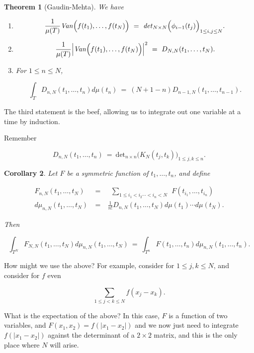 \documentclass[12pt,letterpaper]{report}
\newcommand\be{\begin{equation}}
\newcommand\ee{\end{equation}}
\newcommand\bea{\begin{eqnarray}}
\newcommand\eea{\end{eqnarray}}
\newcommand\ben{\begin{enumerate}}
\newcommand\een{\end{enumerate}}
\newtheorem{thm}{Theorem}[section]
\newtheorem{cor}[thm]{Corollary}
\begin{document}
\begin{thm}[Gaudin-Mehta] We have

\ben

\item

\be \frac{1}{\mu(T)}
\text{\emph{Van}}\Big(f(t_1),\dots,f(t_N)\Big) \ = \
\text{\emph{det}}_{N \times N} \Big( \phi_{i-1}(t_j) \Big)_{1 \le
i,j \le N}. \ee


\item

\be \frac{1}{\mu(T)}
\Big|\text{\emph{Van}}\Big(f(t_1),\dots,f(t_N)\Big)\Big|^2 \ = \
D_{N,N}(t_1,\dots,t_N). \ee


\item For $1 \le n \le N$,

\be \int_T D_{n,N}(t_1,\dots,t_n)d\mu(t_n) \ = \
(N+1-n)D_{n-1,N}(t_1,\dots,t_{n-1}). \ee


\een

\end{thm}

The third statement is the beef, allowing us to integrate out one
variable at a time by induction.

Remember

\be D_{n,N}(t_1,\dots,t_n) \ = \ \text{det}_{n \times n} \Big(
K_N(t_j,t_k) \Big)_{1 \le j,k \le n}. \ee


\begin{cor} Let $F$ be a symmetric function of $t_1, \dots, t_n$,
and define

\bea F_{n,N}(t_1,\dots,t_N) & \  = \ & \ \ \sum_{1 \le i_1 < i_2
\cdots < i_n < N} \ \ F(t_{i_1},\dots, t_{i_n}) \nonumber\\
d\mu_{n,N}(t_1,\dots,t_N) & \ = \ & \frac{1}{n!}
D_{n,N}(t_1,\dots,t_N)d\mu(t_1) \cdots d\mu(t_N). \eea

Then

\be \int_{T^N} F_{N,N}(t_1,\dots,t_N) d\mu_{n,N}(t_1,\dots,t_N) \
= \ \int_{T^n} F(t_1,\dots,t_n) d\mu_{n,N}(t_1,\dots,t_n). \ee

\end{cor}

How might we use the above? For example, consider for $1 \le j, k
\le N$, and consider for $f$ even

\be \sum_{1 \le j < k \le N} f(x_j - x_k). \ee

What is the expectation of the above? In this case, $F$ is a
function of two variables, and $F(x_1,x_2) = f(|x_1 - x_2|)$ and
we now just need to integrate $f(|x_1 - x_2|)$ against the
determinant of a $2 \times 2$ matrix, and this is the only place
where $N$ will arise.
\end{document}
